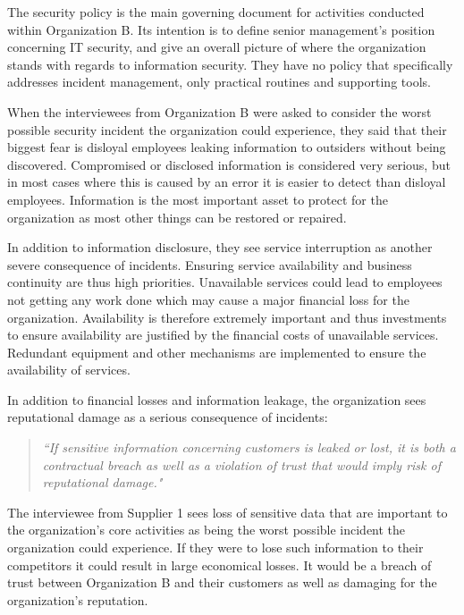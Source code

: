 \documentclass[b5paper, twoside, openright, 11pt]{report}
\begin{document}
The security policy is the main governing document for activities conducted within Organization B. Its intention is to define senior management's position concerning IT security, and give an overall picture of where the organization stands with regards to information security. They have no policy that specifically addresses incident management, only practical routines and supporting tools.

When the interviewees from Organization B were asked to consider the worst possible security incident the organization could experience, they said that their biggest fear is disloyal employees leaking information to outsiders without being discovered. Compromised or disclosed information is considered very serious, but in most cases where this is caused by an error it is easier to detect than disloyal employees. Information is the most important asset to protect for the organization as most other things can be restored or repaired.

In addition to information disclosure, they see service interruption as another severe consequence of incidents. Ensuring service availability and business continuity are thus high priorities. Unavailable services could lead to employees not getting any work done which may cause a major financial loss for the organization. Availability is therefore extremely important and thus investments to ensure availability are justified by the financial costs of unavailable services. Redundant equipment and other mechanisms are implemented to ensure the availability of services. 

In addition to financial losses and information leakage, the organization sees reputational damage as a serious consequence of incidents: 

\begin{quote}
\textit{``If sensitive information concerning customers is leaked or lost, it is both a contractual breach as well as a violation of trust that would imply risk of reputational damage."}
\end{quote}

The interviewee from Supplier 1 sees loss of sensitive data that are important to the organization's core activities as being the worst possible incident the organization could experience. If they were to lose such information to their competitors it could result in large economical losses. It would be a breach of trust between Organization B and their customers as well as damaging for the organization's reputation.	
\end{document}
